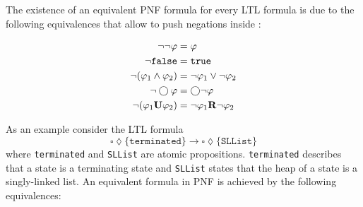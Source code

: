 \documentclass[a4paper, 12pt, twoside]{report}
\begin{document}
	The existence of an equivalent PNF formula for every LTL formula is due to the following equivalences that allow to push negations inside \cite{heinen2015verifyingPhd}:
	
	\begin{align*}
		\neg \neg \varphi &= \varphi\\
		\neg \texttt{false} &= \texttt{true}\\
		\neg (\varphi_1 \wedge \varphi_2) &= \neg \varphi_1 \vee \neg \varphi_2 \\
		\neg \bigcirc \varphi &= \bigcirc \neg \varphi \\
		\neg (\varphi_1 \textbf{\textup{U}} \varphi_2) &= \neg \varphi_1 \textbf{\textup{R}} \neg \varphi_2
	\end{align*}
	
	As an example consider the LTL formula \[\square \lozenge \{\texttt{terminated}\} \rightarrow \square \lozenge \{\texttt{SLList}\}\] where \texttt{terminated} and \texttt{SLList} are atomic propositions. \texttt{terminated} describes that a state is a terminating state and \texttt{SLList} states that the heap of a state is a singly-linked list. An equivalent formula in PNF is achieved by the following equivalences:
\end{document}
